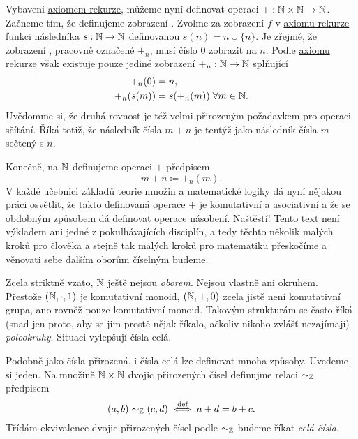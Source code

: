 Vybaveni \hyperref[prop:axiom-rekurze]{axiomem rekurze}, můžeme nyní definovat
operaci $+:\mathbb{N} \times \mathbb{N} \to \mathbb{N}$. Začneme tím, že definujeme zobrazení . Zvolme za zobrazení $f$ v \hyperref[prop:axiom-rekurze]{axiomu rekurze}
funkci následníka ${s:\mathbb{N} \to \mathbb{N}}$ definovanou $s(n) = n \cup \{n\}$. Je zřejmé,
že zobrazení , pracovně označené $+_n$, musí číslo $0$ zobrazit
na $n$. Podle \hyperref[prop:axiom-rekurze]{axiomu rekurze} však existuje pouze
jediné zobrazení $+_n:\mathbb{N} \to \mathbb{N}$ splňující
\begin{align*}
 +_n(0) &= n,\\
 +_n(s(m)) &= s(+_n(m)) \; \forall m \in \mathbb{N}.
\end{align*}
Uvědomme si, že druhá rovnost je též velmi přirozeným požadavkem pro operaci
sčítání. Říká totiž, že následník čísla $m + n$ je tentýž jako následník čísla
$m$ sečtený s $n$.

Konečně, na $\mathbb{N}$ definujeme operaci $+$ předpisem
\[
 m + n \coloneqq +_n(m).
\]
V každé učebnici základů teorie množin a matematické logiky dá nyní nějakou
práci osvětlit, že takto definovaná operace $+$ je komutativní a asociativní a
že se obdobným způsobem dá definovat operace násobení. Naštěstí! Tento text není
výkladem ani jedné z pokulhávajících disciplín, a tedy těchto několik malých
kroků pro člověka a stejně tak malých kroků pro matematiku přeskočíme a věnovati
sebe dalším oborům číselným budeme.

Zcela striktně vzato, $\mathbb{N}$ ještě nejsou \emph{oborem}. Nejsou vlastně ani
okruhem. Přestože $(\mathbb{N}, \cdot ,1)$ je komutativní monoid, $(\mathbb{N},+,0)$ zcela jistě
není komutativní grupa, ano rovněž pouze komutativní monoid. Takovým strukturám
se často říká (snad jen proto, aby se jim prostě nějak říkalo, ačkoliv nikoho
zvlášť nezajímají) \emph{polookruhy}. Situaci vylepšují čísla celá.

Podobně jako čísla přirozená, i čísla celá lze definovat mnoha způsoby. Uvedeme
si jeden. Na množině $\mathbb{N} \times \mathbb{N}$ dvojic přirozených čísel definujme relaci
$ \sim _{\mathbb{Z}}$ předpisem
\[
 (a,b) \sim _{\mathbb{Z}} (c,d) \overset{\text{def}}{ \iff } a + d = b +
 c.
\]
Třídám ekvivalence dvojic přirozených čísel podle $ \sim _{\mathbb{Z}}$ budeme říkat
\emph{celá čísla}.

